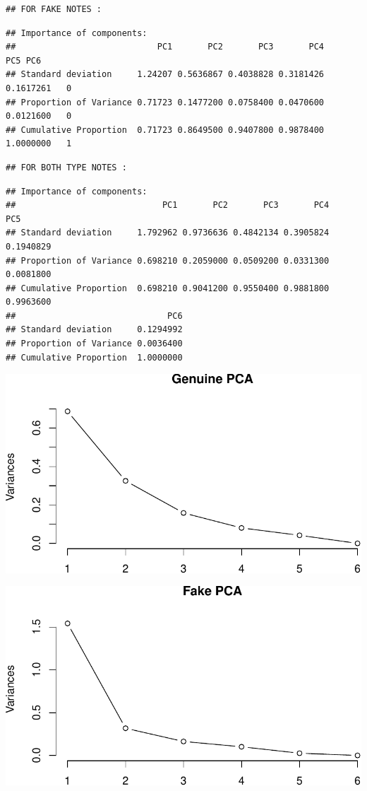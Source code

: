 \documentclass[]{article}
\begin{document}
\begin{verbatim}
## FOR FAKE NOTES :
\end{verbatim}

\begin{verbatim}
## Importance of components:
##                            PC1       PC2       PC3       PC4       PC5 PC6
## Standard deviation     1.24207 0.5636867 0.4038828 0.3181426 0.1617261   0
## Proportion of Variance 0.71723 0.1477200 0.0758400 0.0470600 0.0121600   0
## Cumulative Proportion  0.71723 0.8649500 0.9407800 0.9878400 1.0000000   1
\end{verbatim}

\begin{verbatim}
## FOR BOTH TYPE NOTES :
\end{verbatim}

\begin{verbatim}
## Importance of components:
##                             PC1       PC2       PC3       PC4       PC5
## Standard deviation     1.792962 0.9736636 0.4842134 0.3905824 0.1940829
## Proportion of Variance 0.698210 0.2059000 0.0509200 0.0331300 0.0081800
## Cumulative Proportion  0.698210 0.9041200 0.9550400 0.9881800 0.9963600
##                              PC6
## Standard deviation     0.1294992
## Proportion of Variance 0.0036400
## Cumulative Proportion  1.0000000
\end{verbatim}

\begin{center}\includegraphics{HW5_Solution_files/figure-latex/unnamed-chunk-5-1} \end{center}

\begin{center}\includegraphics{HW5_Solution_files/figure-latex/unnamed-chunk-5-2} \end{center}
\end{document}

